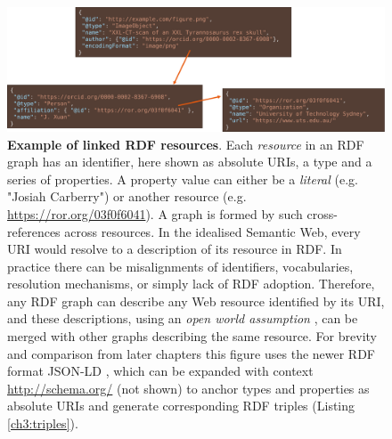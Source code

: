 \newpage
\begin{figure}[tbh]
  \includegraphics[width=\textwidth]{figures/ch03/jsonld.pdf}
    \caption[Example of linked RDF resources]{\textbf{Example of linked RDF resources}. Each \emph{resource} in an RDF graph has an identifier, here shown as absolute URIs, a type and a series of properties. A property value can either be a \emph{literal} (e.g. "Josiah Carberry") or another resource (e.g. \url{https://ror.org/03f0f6041}). A graph is formed by such cross-references across resources.
    In the idealised Semantic Web, every URI would resolve to a description of its resource in RDF. In practice there can be misalignments of identifiers, vocabularies, resolution mechanisms, or simply lack of RDF adoption. Therefore, any RDF graph can describe any Web resource identified by its URI, and these descriptions, using an \emph{open world assumption} \cite{Drummond 2006}, can be merged with other graphs describing the same resource.
    For brevity and comparison from later chapters this figure uses the newer RDF format \gls{JSON-LD} \cite{Sporny 2020}, 
    which can be expanded with context \url{http://schema.org/} (not shown) to anchor types and 
    properties as absolute URIs and generate corresponding RDF triples (Listing \vref{ch3:triples}). 
    }
  \label{ch3:fig:jsonld}
\end{figure}



